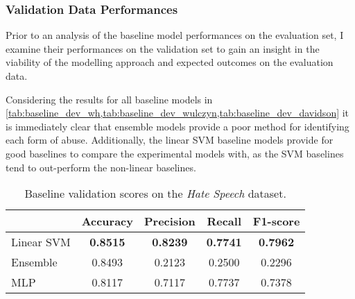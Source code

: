 \begin{table}[h]
  \centering
  \caption{Best hyper parameters for non-linear single task model for each main task dataset.}
  \label{tab:mlp_singletask_params}
\end{table}

\subsubsection{Validation Data Performances}
Prior to an analysis of the baseline model performances on the evaluation set, I examine their performances on the validation set to gain an insight in the viability of the modelling approach and expected outcomes on the evaluation data.

Considering the results for all baseline models in \cref{tab:baseline_dev_wh,tab:baseline_dev_wulczyn,tab:baseline_dev_davidson} it is immediately clear that ensemble models provide a poor method for identifying each form of abuse.
Additionally, the linear SVM baseline models provide for good baselines to compare the experimental models with, as the SVM baselines tend to out-perform the non-linear baselines.

\begin{table}[h]
  \centering
  \begin{tabular}{l|cccc}
               & Accuracy        & Precision       & Recall          & F1-score        \\ \hline
    Linear SVM & \textbf{0.8515} & \textbf{0.8239} & \textbf{0.7741} & \textbf{0.7962} \\
    Ensemble   & 0.8493          & 0.2123          & 0.2500          & 0.2296          \\
    MLP        & 0.8117          & 0.7117          & 0.7737          & 0.7378
  \end{tabular}
  \caption{Baseline validation scores on the \textit{Hate Speech} dataset.}
  \label{tab:baseline_dev_wh}
\end{table}


